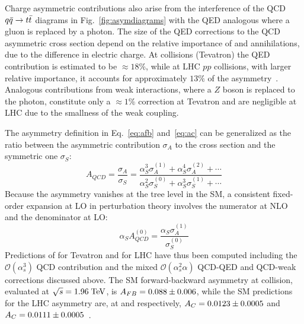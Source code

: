 Charge asymmetric contributions also arise from the interference of
the QCD $\mbox{$q\bar{q}$}{}\to{}\mbox{$t\bar{t}$}{}$ diagrams in
Fig.~\ref{fig:asymdiagrams} with the QED analogous where a gluon is
replaced by a photon. The size of the QED corrections to the QCD
asymmetric cross section depend on the relative importance of \uubar{}
and \ddbar{} annihilations, due to the difference in electric charge.
At \ppbar{} collisions (Tevatron) the QED contribution is estimated to
be $\approx{}18\%$, while at LHC $pp$ collisions, with larger relative
\ddbar{} importance, it accounts for approximately $13\%$ of the
asymmetry~\cite{Kuhn:2011ri}.
Analogous contributions from weak interactions, where a $Z$ boson is
replaced to the photon, constitute only a $\approx{}1\%$ correction at
Tevatron and are negligible at LHC due to the smallness of the
weak coupling.

The asymmetry definition in Eq.~\ref{eq:afb} and~\ref{eq:ac} can be
generalized as the ratio between the asymmetric contribution
$\sigma_A$ to the cross section and the symmetric one $\sigma_S$:
\begin{equation}
  A_{QCD} = \frac{\sigma_A}{\sigma_S} = 
  \frac{\alpha_S^3\sigma_A^{(1)}+\alpha_S^4\sigma_A^{(2)}+\cdots{}}
  {\alpha_S^2\sigma_S^{(0)}+\alpha_S^3\sigma_S^{(1)}+\cdots{}}
\end{equation}
Because the asymmetry vanishes at the tree level in the SM, a
consistent fixed-order expansion at LO in perturbation theory involves the
numerator at NLO and the denominator at LO:
\begin{equation}
  \alpha_SA_{QCD}^{(0)}=\frac{\alpha_S\sigma_A^{(1)}}{\sigma_S^{(0)}}
\end{equation}
Predictions of \afb{} for Tevatron and \ac{} for LHC have thus been
computed including the $\mathcal{O}(\alpha_s^3)$
QCD contribution and the mixed $\mathcal{O}(\alpha_s^2\alpha)$ QCD-QED
and QCD-weak corrections discussed above. The SM forward-backward
asymmetry at \ppbar{} collision, evaluated at $\sqrt{s}=1.96\; \mathrm{TeV}{}$,
is $\mbox{$A_{FB}$}{} = 0.088\pm{}0.006$, while the SM predictions for the LHC
asymmetry are, at \seventev{} and \eighttev{} respectively,
$\mbox{$A_C$}{}=0.0123\pm{}0.0005$ and
$\mbox{$A_C$}{}=0.0111\pm0.0005$~\cite{Bernreuther:2012sx}.
 

